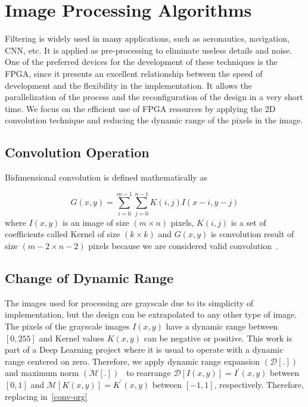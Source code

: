 \documentclass[conference,compsoc]{IEEEtran}
\begin{document}
\section{Image Processing Algorithms}\label{sec:preproc}

Filtering is widely used in many applications, such as aeronautics, navigation,
CNN, etc. It is applied as pre-processing to eliminate useless details and
noise. One of the preferred devices for the development of these techniques is
the FPGA, since it presents an excellent relationship between the speed of
development and the flexibility in the implementation. It allows the
parallelization of the process and the reconfiguration of the design in a very
short time. We focus on the efficient use of FPGA resources by applying the
2D convolution technique and reducing the dynamic range of the pixels in the
image.

\subsection{Convolution Operation}

Bidimensional convolution is defined mathematically as

\begin{equation}\label{conv-org}
  G(x,y) = \sum_{i=0}^{m-1} \sum_{j=0}^{n-1}K(i,j)I(x-i,y-j)
\end{equation}
where $I(x,y)$ is an image of size $(m \times n)$ pixels, $K(i,j)$ is a set of
coefficients called Kernel of size $(k \times k)$ and $G(x,y)$ is convolution
result of size $(m-2 \times n-2)$ pixels because we are considered valid
convolution~\cite{validconv}. 

\subsection{Change of Dynamic Range}

The images used for processing are grayscale due to its simplicity of
implementation, but the design can be extrapolated to any other type of image.
The pixels of the grayscale images $I(x,y)$ have a dynamic range between
$[0,255]$ and Kernel values $K(x,y)$ can be negative or positive. This work is
part of a Deep Learning project where it is usual to operate with a dynamic
range centered on zero. Therefore, we apply dynamic range expansion
$(\mathcal{D}[.])$~\cite{dinamic_rango} and maximum norm
$(\mathcal{M}[.])$~\cite{max_norm} to rearrange
$\mathcal{D}[I(x,y)]=I^\prime(x,y)$ between $[0,1]$ and
$\mathcal{M}[K(x,y)]=K^\prime(x,y)$ between $[-1,1]$, respectively. Therefore,
replacing in~\eqref{conv-org}
\end{document}
